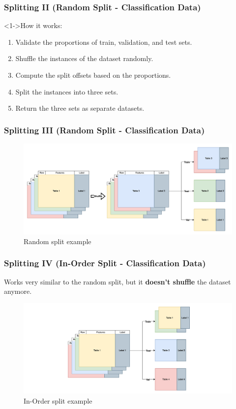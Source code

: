 \documentclass[t,english]{beamer}
\begin{document}
\begin{frame}
  \frametitle{Splitting II (Random Split - Classification Data)}
  \begin{block}<1->{How it works:}
    \begin{enumerate}
      \item<1-> Validate the proportions of train, validation, and test sets.
      \item <2-> Shuffle the instances of the dataset randomly.
      \item <3-> Compute the split offsets based on the proportions.
      \item <4-> Split the instances into three sets.
      \item <5-> Return the three sets as separate datasets.
    \end{enumerate}
  \end{block}
\end{frame}

\begin{frame}
  \frametitle{Splitting III (Random Split - Classification Data)}
  \begin{figure}[H]
    \includegraphics[width=1\textwidth]{figures/splitting/random_split.png}
    \caption{Random split example}
    \label{fig:random_split}
  \end{figure}
\end{frame}

\begin{frame}
  \frametitle{Splitting IV (In-Order Split - Classification Data)}
  Works very similar to the random split, but it \textbf{doesn't shuffle} the dataset anymore.

  \begin{figure}[H]
    \includegraphics[width=1\textwidth]{figures/splitting/in_order_split.png}
    \caption{In-Order split example}
    \label{fig:in_order_split}
  \end{figure}
\end{frame}
\end{document}
